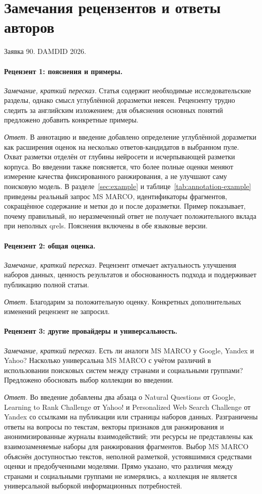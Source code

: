 \section*{Замечания рецензентов и ответы авторов}
\noindent Заявка 90. DAMDID 2026.

\paragraph{Рецензент 1: пояснения и примеры.}
\emph{Замечание, краткий пересказ.} Статья содержит необходимые исследовательские разделы, однако смысл углублённой доразметки неясен. Рецензенту трудно следить за английским изложением; для объяснения основных понятий предложено добавить конкретные примеры.

\emph{Ответ.} В аннотацию и введение добавлено определение углублённой доразметки как расширения оценок на несколько ответов-кандидатов в выбранном пуле. Охват разметки отделён от глубины нейросети и исчерпывающей разметки корпуса. Во введении также поясняется, что более полные оценки меняют измерение качества фиксированного ранжирования, а не улучшают саму поисковую модель. В разделе~\ref{sec:example} и таблице~\ref{tab:annotation-example} приведены реальный запрос MS MARCO, идентификаторы фрагментов, сокращённое содержание и метки до и после доразметки. Пример показывает, почему правильный, но неразмеченный ответ не получает положительного вклада при неполных qrels. Пояснения включены в обе языковые версии.

\paragraph{Рецензент 2: общая оценка.}
\emph{Замечание, краткий пересказ.} Рецензент отмечает актуальность улучшения наборов данных, ценность результатов и обоснованность подхода и поддерживает публикацию полной статьи.

\emph{Ответ.} Благодарим за положительную оценку. Конкретных дополнительных изменений рецензент не запросил.

\paragraph{Рецензент 3: другие провайдеры и универсальность.}
\emph{Замечание, краткий пересказ.} Есть ли аналоги MS MARCO у Google, Yandex и Yahoo? Насколько универсальна MS MARCO с учётом различий в использовании поисковых систем между странами и социальными группами? Предложено обосновать выбор коллекции во введении.

\emph{Ответ.} Во введение добавлены два абзаца о Natural Questions от Google, Learning to Rank Challenge от Yahoo! и Personalized Web Search Challenge от Yandex со ссылками на публикации или страницы наборов данных. Разграничены ответы на вопросы по текстам, векторы признаков для ранжирования и анонимизированные журналы взаимодействий; эти ресурсы не представлены как взаимозаменяемые наборы для ранжирования фрагментов. Выбор MS MARCO объяснён доступностью текстов, неполной разметкой, устоявшимися средствами оценки и предобученными моделями. Прямо указано, что различия между странами и социальными группами не измерялись, а коллекция не является универсальной выборкой информационных потребностей.
